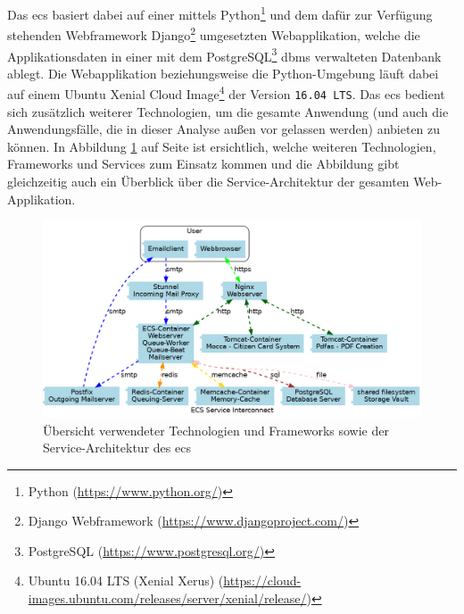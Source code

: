 \documentclass[a4paper,12pt,twoside]{scrreprt}
\begin{document}
Das \acl{ecs} basiert dabei auf einer mittels Python\footnote{Python (\url{https://www.python.org/})} und dem dafür zur Verfügung stehenden Webframework Django\footnote{Django Webframework (\url{https://www.djangoproject.com/})} umgesetzten Webapplikation, welche die Applikationsdaten in einer mit dem PostgreSQL\footnote{PostgreSQL (\url{https://www.postgresql.org/)}} \ac{dbms} verwalteten Datenbank ablegt. Die Webapplikation beziehungsweise die Python-Umgebung läuft dabei auf einem Ubuntu Xenial Cloud Image\footnote{Ubuntu 16.04 LTS (Xenial Xerus) (\url{https://cloud-images.ubuntu.com/releases/server/xenial/release/})} der Version \texttt{16.04 LTS}. Das \ac{ecs} bedient sich zusätzlich weiterer Technologien, um die gesamte Anwendung (und auch die Anwendungsfälle, die in dieser Analyse außen vor gelassen werden) anbieten zu können. In Abbildung \ref{fig:ecs-service-architektur} auf Seite \pageref{fig:ecs-service-architektur} ist ersichtlich, welche weiteren Technologien, Frameworks und Services zum Einsatz kommen und die Abbildung gibt gleichzeitig auch ein Überblick über die Service-Architektur der gesamten Web-Applikation. \cite{medizinische_universitat_wien_ecs_2021-1, medizinische_universitat_wien_ecs_2021}

\begin{figure}[ht]
    \centering
    \includegraphics[width=\linewidth]{thesis/images/ECS_Service-Architecture.png}
    \caption[Übersicht verwendeter Technologien und Frameworks sowie der Service-Architektur des \acl{ecs}]{Übersicht verwendeter Technologien und Frameworks sowie der Service-Architektur des \acl{ecs} \cite{medizinische_universitat_wien_ecs_2021}}
    \label{fig:ecs-service-architektur}
\end{figure}
\end{document}
